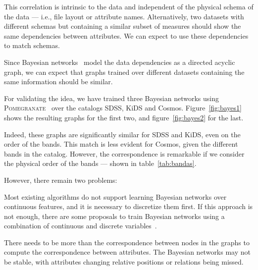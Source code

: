 This correlation is intrinsic to the data and independent of the physical
schema of the data --- i.e., file layout or attribute names. Alternatively,
two datasets with different schemas but containing a similar subset of
measures should show the same dependencies between attributes. We can
expect to use these dependencies to match schemas\footnotemark.


Since Bayesian networks~\cite{pearl1988}  model the data dependencies
as a directed acyclic graph, we can expect that graphs trained over different
datasets containing the same information should be similar.

For validating the idea, we have trained three Bayesian networks using
\textsc{Pomegranate}~\cite{schreiber2018pomegranate} over the catalogs
\gls{SDSS}, \gls{KiDS} and \gls{Cosmos}. Figure~\ref{fig:bayes1} shows the
resulting graphs for the first two, and figure~\ref{fig:bayes2} for the last.

Indeed, these graphs are significantly similar for \gls{SDSS} and \gls{KiDS},
even on the order of the bands. This match is less evident for \gls{Cosmos},
given the different bands in the catalog. However, the correspondence is
remarkable if we consider the physical order of the bands --- shown in table~\ref{tab:bandas}.

However, there remain two problems:

Most existing algorithms do not support learning Bayesian networks over continuous features,
and it is necessary to discretize them first. If this approach is not enough, there are some
proposals to train Bayesian networks using a combination of continuous and discrete
variables~\cite{Lucas2015,chen2017}.

There needs to be more than the correspondence between nodes in the graphs to compute
the correspondence between attributes. The Bayesian networks may not be stable, with
attributes changing relative positions or relations being missed.

